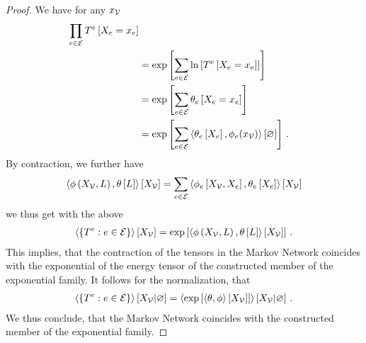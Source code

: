 \begin{proof}
    We have for any $x_{\mathcal{V}}$
    \begin{align*}
        \prod_{e\in\mathcal{E}} T^{e}\left[X_{e}=x_{e}\right] \\
        &= \mathrm{exp}\left[\sum_{e\in\mathcal{E}} \ln \left[ T^{e}\left[X_{e}=x_{e}\right] \right]\right] \\
        &= \mathrm{exp}\left[\sum_{e\in\mathcal{E}} \theta_{e}\left[X_{e}=x_{e}\right]\right] \\
        &= \mathrm{exp}\left[\sum_{e\in\mathcal{E}} \left\langle \theta_{e}\left[X_{e}\right],\phi_{e}(x_{\mathcal{V}})\right\rangle \left[ \varnothing \right]\right]  \, .
    \end{align*}
    By contraction, we further have
    \begin{align*}
        \left\langle \phi\left(X_{\mathcal{V}},L\right),\theta\left[L\right]\right\rangle \left[ X_{\mathcal{V}} \right]
        = \sum_{e\in\mathcal{E}} \left\langle \phi_{e}\left[X_{\mathcal{V}},X_{e}\right],\theta_{e}\left[X_{e}\right]\right\rangle \left[ X_{\mathcal{V}} \right]
    \end{align*}
    we thus get with the above
    \begin{align}
        \left\langle \{T^{e}: e\in\mathcal{E}\}\right\rangle \left[ X_{\mathcal{V}} \right]
        = \mathrm{exp}\left[\left\langle \phi\left(X_{\mathcal{V}},L\right),\theta\left[L\right]\right\rangle \left[ X_{\mathcal{V}} \right]\right] \, .
    \end{align}
    This implies, that the contraction of the tensors in the Markov Network coincides with the exponential of the energy tensor of the constructed member of the exponential family.
    It follows for the normalization, that
    \begin{align}
        \left\langle \{T^{e}: e\in\mathcal{E}\}\right\rangle \left[ X_{\mathcal{V}} | \varnothing \right]
        = \left\langle \mathrm{exp}\left[\left\langle \theta,\phi\right\rangle \left[ X_{\mathcal{V}} \right]\right]\right\rangle \left[ X_{\mathcal{V}} | \varnothing \right] \, .
    \end{align}
    We thus conclude, that the Markov Network coincides with the constructed member of the exponential family.
\end{proof}

